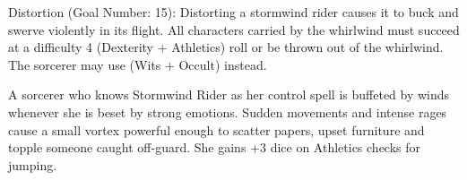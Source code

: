 \documentclass[oneside]{book}
\begin{document}
\begin{multicols}{2}
  Distortion (Goal Number: 15): Distorting a stormwind rider causes it to buck and swerve violently in its flight. All characters carried by the whirlwind must succeed at a difficulty 4 (Dexterity + Athletics) roll or be thrown out of the whirlwind. The sorcerer may use (Wits + Occult) instead.

  A sorcerer who knows Stormwind Rider as her control spell is buffeted by winds whenever she is beset by strong emotions. Sudden movements and intense rages cause a small vortex powerful enough to scatter papers, upset furniture and topple someone caught off-guard. She gains +3 dice on Athletics checks for jumping.

\end{multicols}
\end{document}
